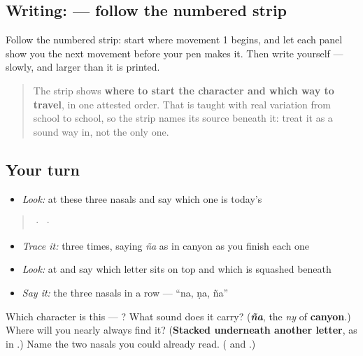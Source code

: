 \subsection*{Writing:  — follow the numbered strip}

Follow the numbered strip: start where movement 1 begins, and let each panel show you the next movement before your pen makes it. Then write  yourself — slowly, and larger than it is printed.

\begin{quote}
The strip shows \textbf{where to start the character and which way to travel}, in one attested order. That is taught with real variation from school to school, so the strip names its source beneath it: treat it as a sound way in, not the only one.
\end{quote}

\subsection*{Your turn}
\begin{itemize}
\raggedright
  \item \emph{Look:} at these three nasals and say which one is today's
\end{itemize}

\begin{quote}
  ·    ·  
\end{quote}

\begin{itemize}
\raggedright
  \item \emph{Trace it:}  three times, saying \emph{ña} as in canyon as you finish each one
  \item \emph{Look:} at  and say which letter sits on top and which is squashed beneath
  \item \emph{Say it:} the three nasals in a row — \textquotedblleft{}na, ṇa, ña\textquotedblright{}
\end{itemize}

\begin{tcolorbox}[breakable,colback=teal!4,colframe=teal!35!black,title={Before you move on}]
Which character is this — ? What sound does it carry? (\emph{\textbf{ña}}, the \emph{ny} of \textbf{canyon}.) Where will you nearly always find it? (\textbf{Stacked underneath another letter}, as in \textbf{}.) Name the two nasals you could already read. (\textbf{} and \textbf{}.)
\end{tcolorbox}
